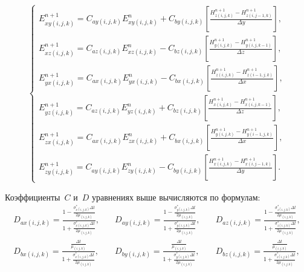 \begin{equation*}
\left\{
\begin{aligned}
E_{xy (i,j,k)}^{n+1} = C_{ay (i,j,k)} E_{xy (i,j,k)}^{n} + C_{by (i,j,k)}
\left[
    \frac{H_{z (i,j,k)}^{n+1} - H_{z (i,j-1,k)}^{n+1}}{\Delta y}
\right], \\
E_{xz (i,j,k)}^{n+1} = C_{az (i,j,k)} E_{xz (i,j,k)}^{n} - C_{bz (i,j,k)}
\left[
    \frac{H_{y (i,j,k)}^{n+1} - H_{y (i,j,k-1)}^{n+1}}{\Delta z}
\right], \\
E_{yx (i,j,k)}^{n+1} = C_{ax (i,j,k)} E_{yx (i,j,k)}^{n} - C_{bx (i,j,k)}
\left[
    \frac{H_{z (i,j,k)}^{n+1} - H_{z (i-1,j,k)}^{n+1}}{\Delta x}
\right], \\
E_{yz (i,j,k)}^{n+1} = C_{az (i,j,k)} E_{yz (i,j,k)}^{n} + C_{bz (i,j,k)}
\left[
    \frac{H_{x (i,j,k)}^{n+1} - H_{x (i,j,k-1)}^{n+1}}{\Delta z}
\right], \\
E_{zx (i,j,k)}^{n+1} = C_{ax (i,j,k)} E_{zx (i,j,k)}^{n} + C_{bx (i,j,k)}
\left[
    \frac{H_{y (i,j,k)}^{n+1} - H_{y (i-1,j,k)}^{n+1}}{\Delta x}
\right], \\
E_{zy (i,j,k)}^{n+1} = C_{ay (i,j,k)} E_{zy (i,j,k)}^{n} - C_{by (i,j,k)}
\left[
    \frac{H_{x (i,j,k)}^{n+1} - H_{x (i,j-1,k)}^{n+1}}{\Delta y}
\right].
\end{aligned}
\right.
\end{equation*}

Коэффициенты~$C$ и~$D$ уравнениях выше вычисляются по формулам:
\begin{equation*}
\begin{aligned}
D_{ax (i,j,k)} =
\frac
{
    1-\frac{\sigma_{x (i,j,k)}^*\Delta t}{2\mu_{(i,j,k)}}
}{
    1+\frac{\sigma_{x (i,j,k)}^*\Delta t}{2\mu_{(i,j,k)}}
}, \\
D_{bx (i,j,k)} =
\frac
{
    \frac{\Delta t}{\mu_{(i,j,k)}}
}{
    1+\frac{\sigma_{x (i,j,k)}^*\Delta t}{2\mu_{(i,j,k)}}
},
\end{aligned}
\quad
\begin{aligned}
D_{ay (i,j,k)} =
\frac
{
    1-\frac{\sigma_{y (i,j,k)}^*\Delta t}{2\mu_{(i,j,k)}}
}{
    1+\frac{\sigma_{y (i,j,k)}^*\Delta t}{2\mu_{(i,j,k)}}
}, \\
D_{by (i,j,k)} =
\frac
{
    \frac{\Delta t}{\mu_{(i,j,k)}}
}{
    1+\frac{\sigma_{y (i,j,k)}^*\Delta t}{2\mu_{(i,j,k)}}
},
\end{aligned}
\quad
\begin{aligned}
D_{az (i,j,k)} =
\frac
{
    1-\frac{\sigma_{z (i,j,k)}^*\Delta t}{2\mu_{(i,j,k)}}
}{
    1+\frac{\sigma_{z (i,j,k)}^*\Delta t}{2\mu_{(i,j,k)}}
}, \\
D_{bz (i,j,k)} =
\frac
{
    \frac{\Delta t}{\mu_{(i,j,k)}}
}{
    1+\frac{\sigma_{z (i,j,k)}^*\Delta t}{2\mu_{(i,j,k)}}
},
\end{aligned}
\end{equation*}

